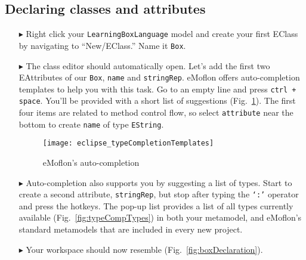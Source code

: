 \newpage
\hypertarget{static:classes tex}{}
\subsection{Declaring classes and attributes}
\texHeader

\begin{itemize}

\item[$\blacktriangleright$] Right click your \texttt{LearningBoxLanguage} model and create your first EClass by navigating to ``New/EClass.'' Name it
\texttt{Box}.

\vspace{0.5cm}

\item[$\blacktriangleright$] The class editor should automatically open. Let's add the first two EAttributes of our \texttt{Box}, \texttt{name} and
\texttt{stringRep}. eMoflon offers auto-completion templates to help you with this task. Go to an empty line and press \texttt{ctrl + space}. You'll be provided
with a short list of suggestions (Fig.~\ref{fig:typeCompTempl}). The first four items are related to method control flow, so select \texttt{attribute} near
the bottom to create \texttt{name} of type \texttt{EString}.

\vspace{0.5cm}

\begin{figure}[htbp]
	\centering
  \texttt{[image: eclipse\_typeCompletionTemplates]}
	\caption{eMoflon's auto-completion}
	\label{fig:typeCompTempl}
\end{figure} 

\vspace{0.5cm}

\item[$\blacktriangleright$] Auto-completion also supports you by suggesting a list of types. Start to create a second attribute, \texttt{stringRep}, but
stop after typing the \texttt{`:'} operator and press the hotkeys. The pop-up list provides a list of all types currently available (Fig.~\ref{fig:typeCompTypes}) in
both your metamodel, and eMoflon's standard metamodels that are included in every new project.

\vspace{0.5cm}

\item[$\blacktriangleright$] Your workspace should now resemble (Fig.~\ref{fig:boxDeclaration}).


\end{itemize}
